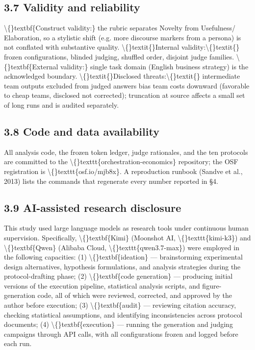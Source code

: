 \documentclass[11pt,a4paper]{article}
\begin{document}
\subsection{3.7 Validity and reliability}

\textbackslash\{\}textbf\{Construct validity:\} the rubric separates Novelty from Usefulness/
Elaboration, so a stylistic shift (e.g. more discourse markers from a
persona) is not conflated with substantive quality. \textbackslash\{\}textit\{\}Internal
validity:\textbackslash\{\}textit\{\} frozen configurations, blinded judging, shuffled order,
disjoint judge families. \textbackslash\{\}textbf\{External validity:\} single task domain
(English business strategy) is the acknowledged boundary. \textbackslash\{\}textit\{\}Disclosed
threats:\textbackslash\{\}textit\{\} intermediate team outputs excluded from judged answers bias
team costs downward (favorable to cheap teams, disclosed not
corrected); truncation at source affects a small set of long runs and
is audited separately.

\subsection{3.8 Code and data availability}

All analysis code, the frozen token ledger, judge rationales, and the
ten protocols are committed to the \textbackslash\{\}texttt\{orchestration-economics\}
repository; the OSF registration is \textbackslash\{\}texttt\{osf.io/mjb8x\}. A reproduction
runbook (Sandve et al., 2013) lists the commands that regenerate every
number reported in §4.

\subsection{3.9 AI-assisted research disclosure}

This study used large language models as research tools under continuous
human supervision. Specifically, \textbackslash\{\}textbf\{Kimi\} (Moonshot AI, \textbackslash\{\}texttt\{kimi-k3\}) and
\textbackslash\{\}textbf\{Qwen\} (Alibaba Cloud, \textbackslash\{\}texttt\{qwen3.7-max\}) were employed in the following
capacities: (1) \textbackslash\{\}textbf\{ideation\} — brainstorming experimental design
alternatives, hypothesis formulations, and analysis strategies during
the protocol-drafting phase; (2) \textbackslash\{\}textbf\{code generation\} — producing initial
versions of the execution pipeline, statistical analysis scripts, and
figure-generation code, all of which were reviewed, corrected, and
approved by the author before execution; (3) \textbackslash\{\}textbf\{audit\} — reviewing
citation accuracy, checking statistical assumptions, and identifying
inconsistencies across protocol documents; (4) \textbackslash\{\}textbf\{execution\} — running
the generation and judging campaigns through API calls, with all
configurations frozen and logged before each run.
\end{document}

